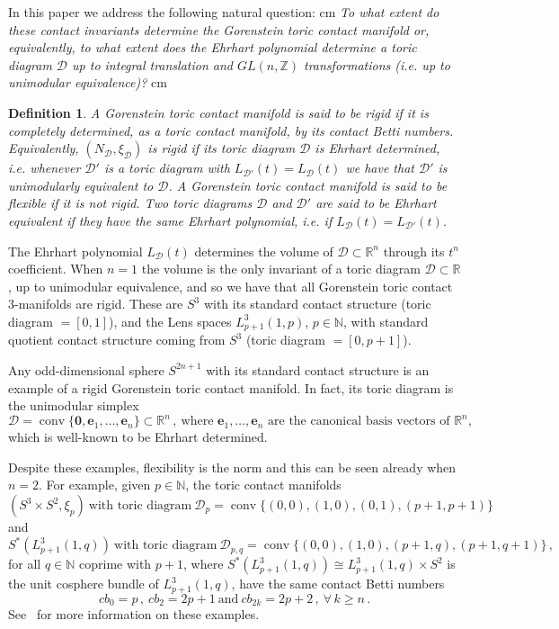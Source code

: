\documentclass[a4paper,11pt,reqno]{amsart}
\newcommand{\R}{\mathbb R}
\newcommand{\Z}{\mathbb Z}
\newcommand{\N}{\mathbb N}
\newcommand{\Dd}{{\mathcal D}}
\DeclareMathOperator{\conv}{conv}
\newtheorem{definition}[theorem]{Definition}
\begin{document}
In this paper we address the following natural question: 
 cm
\noindent \emph{To what extent do these contact invariants determine the Gorenstein toric contact manifold or, 
equivalently, to what extent does the Ehrhart polynomial determine a toric diagram $\Dd$ 
up to integral translation and $GL(n,\Z)$ transformations (i.e. up to unimodular equivalence)?} 
 cm
\begin{definition} \label{def:rigid}
A Gorenstein toric contact manifold is said to be \emph{rigid} if it is completely determined, as a toric contact 
manifold, by its contact Betti numbers. Equivalently, $(N_\Dd, \xi_\Dd)$ is rigid if its toric diagram $\Dd$ is 
\emph{Ehrhart determined}, i.e. whenever $\Dd'$ is a toric diagram with  $L_{\Dd'} (t) = L_{\Dd} (t)$ we have 
that $\Dd'$ is unimodularly equivalent to $\Dd$. A Gorenstein toric contact manifold is said to be \emph{flexible} 
if it is not rigid. Two toric diagrams $\Dd$ and $\Dd'$ are said to be \emph{Ehrhart equivalent} if they have the
same Ehrhart polynomial, i.e. if $L_{\Dd} (t) = L_{\Dd'} (t)$.
\end{definition}

The Ehrhart polynomial $L_{\Dd} (t)$ determines the volume of $\Dd\subset\R^n$ through its $t^n$ coefficient.
When $n=1$ the volume is the only invariant of a toric diagram $\Dd\subset\R$, up to unimodular equivalence,
and so we have that all Gorenstein toric contact $3$-manifolds are rigid. These are $S^3$ with its standard 
contact structure (toric diagram $=[0,1]$), and the Lens spaces $L^3_{p+1} (1,p)$, $p\in\N$, with standard 
quotient contact structure coming from $S^3$ (toric diagram $=[0,p+1]$).

Any odd-dimensional sphere $S^{2n+1}$ with its standard contact structure is an example of a rigid Gorenstein
toric contact manifold. In fact, its toric diagram is the unimodular simplex
\[
\Dd = \conv \{ \bm{0}, \bm{e}_1, \ldots, \bm{e}_n \} \subset\R^n\,,\ \text{where $\bm{e}_1, \ldots, \bm{e}_n$ are
the canonical basis vectors of $\R^n$,}
\]
which is well-known to be Ehrhart determined.

Despite these examples, flexibility is the norm and this can be seen already when $n=2$. For example,
given $p\in\N$, the toric contact manifolds 
\[
(S^3 \times S^2, \xi_p)\ \text {with toric diagram} \ \Dd_p = \conv\{(0,0), (1,0),(0,1), (p+1,p+1)\}
\]
and
\[
S^\ast (L^3_{p+1}(1,q)) \ \text {with toric diagram} \ \Dd_{p,q} = \conv\{(0,0), (1,0),(p+1,q), (p+1,q+1)\}\,,
\]
for all $q\in\N$ coprime with $p+1$, where $S^\ast (L^3_{p+1}(1,q))\cong L^3_{p+1}(1,q) \times S^2$ is
the unit cosphere bundle of $L^3_{p+1}(1,q)$, have the same contact Betti numbers
\[
cb_0 = p\,,\ cb_2 = 2p+1 \ \text{and}\ cb_{2k} = 2p+2\,,\ \forall\, k\geq n\,.
\]
See~\cite{AM0, AMM0} for more information on these examples.
\end{document}
